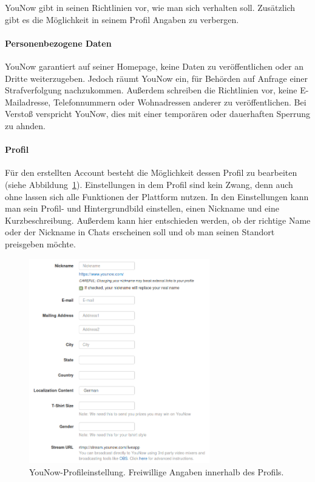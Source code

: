 YouNow gibt in seinen Richtlinien vor, wie man sich verhalten soll. Zusätzlich gibt es die Möglichkeit in seinem Profil Angaben zu verbergen.

\paragraph{Personenbezogene Daten}
YouNow garantiert auf seiner Homepage, keine Daten zu veröffentlichen oder an Dritte weiterzugeben. Jedoch räumt YouNow ein, für Behörden auf Anfrage einer Strafverfolgung nachzukommen. Außerdem schreiben die Richtlinien vor, keine E-Mailadresse, Telefonnummern oder Wohnadressen anderer zu veröffentlichen. Bei Verstoß verspricht YouNow, dies mit einer temporären oder dauerhaften Sperrung zu ahnden.

\paragraph{Profil}
Für den erstellten Account besteht die Möglichkeit dessen Profil zu bearbeiten (siehe Abbildung~\ref{profil_einstellungen}). Einstellungen in dem Profil sind kein Zwang, denn auch ohne lassen sich alle Funktionen der Plattform nutzen. In den Einstellungen kann man sein Profil- und Hintergrundbild einstellen, einen Nickname und eine Kurzbeschreibung. Außerdem kann hier entschieden werden, ob der richtige Name oder der Nickname in Chats erscheinen soll und ob man seinen Standort preisgeben möchte.

\begin{figure}[ht!]
\centering
\includegraphics[width=0.7\textwidth]{./resources/younow_profile_settings}
\caption{YouNow-Profileinstellung. Freiwillige Angaben innerhalb des Profils.}
\label{profil_einstellungen}
\end{figure} 
